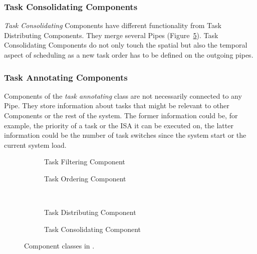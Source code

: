 \subsubsection{Task Consolidating Components}

\emph{Task Consolidating} Components have different functionality from Task Distributing Components. They merge several Pipes (Figure~\ref{fig:features:consolidating}). Task Consolidating Components do not only touch the spatial but also the temporal aspect of scheduling as a new task order has to be defined on the outgoing pipes.

\subsubsection{Task Annotating Components}

Components of the \emph{task annotating} class are not necessarily connected to any Pipe. They store information about tasks that might be relevant to other Components or the rest of the system. The former information could be, for example, the priority of a task or the \ac{ISA} it can be executed on, the latter information could be the number of task switches since the system start or the current system load.

\begin{figure}[t!]
	\centering\vspace{5mm}
	\begin{subfigure}[b]{0.48\textwidth}\centering
		\caption{Task Filtering Component}%
		\label{fig:features:filtering}
	\end{subfigure}%
	\hfill %
	\begin{subfigure}[b]{0.48\textwidth}\centering
		\caption{Task Ordering Component}%
		\label{fig:features:ordering}
	\end{subfigure}
	\\ \vspace{0.75cm}
	\begin{subfigure}[b]{0.48\textwidth}\centering
		\caption{Task Distributing Component}%
		\label{fig:features:distributing}
	\end{subfigure}%
	\hfill %
	\begin{subfigure}[b]{0.48\textwidth}\centering
		\caption{Task Consolidating Component}%
		\label{fig:features:consolidating}
	\end{subfigure}
	\caption[Component classes in CoBaS.]{Component classes in \cobas{}.}
\end{figure}

